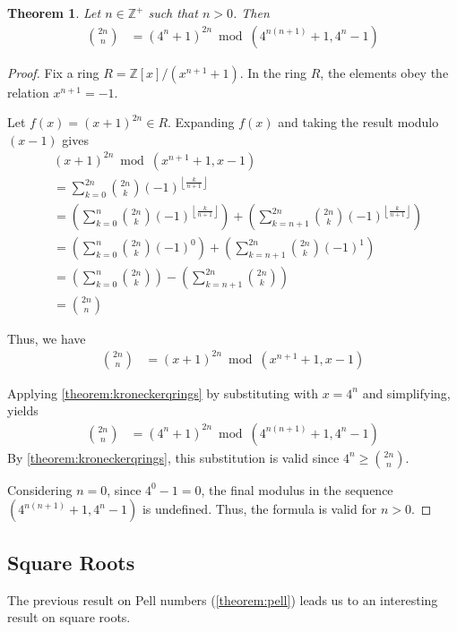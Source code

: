 \documentclass[12pt,reqno]{article}
\theoremstyle{plain}
\newtheorem{theorem}{Theorem}
\theoremstyle{definition}
\newcommand{\floor}[1]{\left\lfloor #1 \right\rfloor}
\begin{document}
\begin{theorem} \label{theorem:cbc}
Let $n \in \mathbb{Z}^+$ such that $n > 0$. Then
\begin{align*}
\binom{2n}{n} &= (4^n + 1)^{2n} \bmod{(4^{n(n+1)} + 1, 4^n - 1)}
\end{align*}
\end{theorem}
\begin{proof}
Fix a ring $R = \mathbb{Z}[x]/(x^{n+1} + 1)$. In the ring $R$, the elements obey the relation $x^{n+1} = -1$.

Let $f(x) = (x + 1)^{2n} \in R$. Expanding $f(x)$ and taking the result modulo $(x-1)$ gives
\begin{align*}
& (x + 1)^{2n} \bmod{(x^{n+1} + 1, x - 1)} \\
&= \sum_{k=0}^{2n} \binom{2n}{k} (-1)^{\floor{\frac{k}{n+1}}} \\
&= \left( \sum_{k=0}^{n} \binom{2n}{k} (-1)^{\floor{\frac{k}{n+1}}} \right) + \left( \sum_{k=n+1}^{2n} \binom{2n}{k} (-1)^{\floor{\frac{k}{n+1}}} \right) \\
&= \left( \sum_{k=0}^{n} \binom{2n}{k} (-1)^0 \right) + \left( \sum_{k=n+1}^{2n} \binom{2n}{k} (-1)^1 \right) \\
&= \left( \sum_{k=0}^{n} \binom{2n}{k} \right) - \left( \sum_{k=n+1}^{2n} \binom{2n}{k} \right) \\
&= \binom{2n}{n}
\end{align*}

Thus, we have
\begin{align*}
    \binom{2n}{n} &= (x + 1)^{2n} \bmod{(x^{n+1} + 1, x - 1)}
\end{align*}

Applying \cref{theorem:kroneckerqrings} by substituting with $x = 4^n$ and simplifying, yields
\begin{align*}
    \binom{2n}{n} &= (4^n + 1)^{2n} \bmod{(4^{n(n+1)} + 1, 4^n-1)}
\end{align*}
By \cref{theorem:kroneckerqrings}, this substitution is valid since $4^n \geq \binom{2n}{n}$.

Considering $n = 0$, since $4^0-1 = 0$, the final modulus in the sequence $(4^{n(n+1)} + 1, 4^n-1)$ is undefined. Thus, the formula is valid for $n > 0$.
\end{proof}

\subsection{Square Roots}
The previous result on Pell numbers (\cref{theorem:pell}) leads us to an interesting result on square roots.
\end{document}
